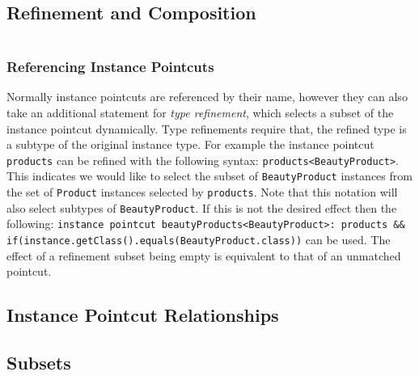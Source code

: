 \documentclass{llncs}
\begin{document}

\subsection{Refinement and Composition}

\begin{lstlisting}[float=h!, caption={An instance pointcu ...}, label={lst:wishlisted}]

\end{lstlisting}


\subsubsection{Referencing Instance Pointcuts}
Normally instance pointcuts are referenced by their name, however they can also take an additional statement for \emph{type refinement}, which selects a subset of the instance pointcut dynamically. Type refinements require that, the refined type is a subtype of the original instance type. For example the instance pointcut \texttt{products} can be refined with the following syntax: \lstinline!products<BeautyProduct>!. 
This indicates we would like to select the subset of \texttt{BeautyProduct} instances from the set of \texttt{Product} instances selected by \texttt{products}. 
Note that this notation will also select subtypes of \texttt{BeautyProduct}. 
If this is not the desired effect then the following: \lstinline!instance pointcut beautyProducts<BeautyProduct>: products && if(instance.getClass().equals(BeautyProduct.class))! can be used. 
The effect of a refinement subset being empty is equivalent to that of an unmatched pointcut. 



\subsection{Instance Pointcut Relationships}

\subsection{Subsets}
\end{document}
